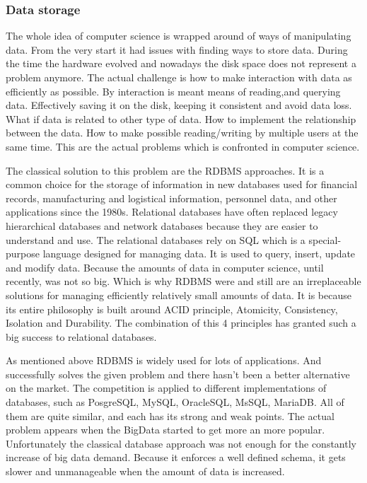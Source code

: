 \subsubsection{Data storage}
The whole idea of computer science is wrapped around of ways of manipulating data. From the very start it had issues with finding ways to store data. During the time the hardware evolved and nowadays the disk space does not represent a problem anymore. The actual challenge is how to make interaction with data as efficiently as possible. By interaction is meant means of reading,and querying data. Effectively saving it on the disk, keeping it consistent and avoid data loss. What if data is related to other type of data. How to  implement the relationship between the data. How to make possible reading/writing by multiple users at the same time. This are the actual problems which is confronted in computer science.

The classical solution to this problem are the RDBMS approaches. It is a common choice for the storage of information in new databases used for financial records, manufacturing and logistical information, personnel data, and other applications since the 1980s. Relational databases have often replaced legacy hierarchical databases and network databases because they are easier to understand and use. The relational databases rely on SQL which is a special-purpose language designed for managing data. It is used to query, insert, update and modify data. Because the amounts of data in computer science, until recently, was not so big. Which is why RDBMS were and still are an irreplaceable solutions for managing efficiently relatively small amounts of data. It is because its entire philosophy is built around ACID principle, Atomicity, Consistency, Isolation and Durability. The combination of this 4 principles has granted such a big success to relational databases.

As mentioned above RDBMS is widely used for lots of applications. And successfully solves the given problem and there hasn't been a better alternative on the market. The competition is applied to different implementations of databases, such as PosgreSQL, MySQL, OracleSQL, MsSQL, MariaDB. All of them are quite similar, and each has its strong and weak points. The actual problem appears when the BigData started to get more an more popular. Unfortunately the classical database approach was not enough for the constantly increase of big data demand. Because it enforces a well defined schema, it gets slower and unmanageable when the amount of data is increased.

